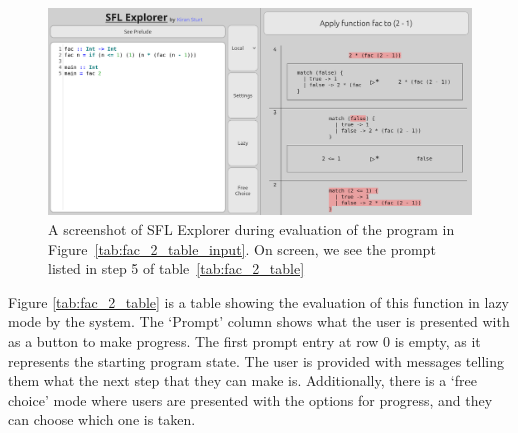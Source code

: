 \begin{figure}[t]
  \centering
  \includegraphics[width=0.95\linewidth]{images/intro_fac_2.png}
  \caption{A screenshot of SFL Explorer  during evaluation of the program in Figure~\ref{tab:fac_2_table_input}. On screen, we see the prompt listed in step 5 of table~\ref{tab:fac_2_table}}
  \label{intro_fac_2_screenshot}
\end{figure}

\noindent Figure \ref{tab:fac_2_table} is a table showing the evaluation of this function in lazy mode by the system. The `Prompt' column shows what the user is presented with as a button to make progress. The first prompt entry at row $0$ is empty, as it represents the starting program state. The user is provided with messages telling them what the next step that they can make is. Additionally, there is a `free choice' mode where users are presented with the options for progress, and they can choose which one is taken. 



